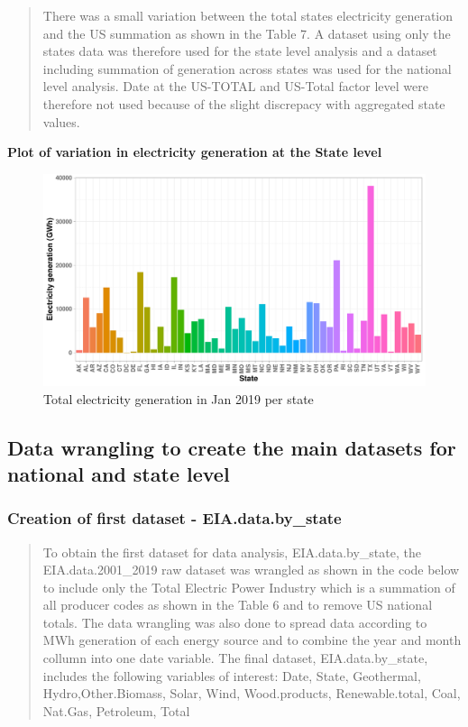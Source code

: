 \documentclass[12pt,]{article}
\begin{document}
\begin{quote}
There was a small variation between the total states electricity
generation and the US summation as shown in the Table 7. A dataset using
only the states data was therefore used for the state level analysis and
a dataset including summation of generation across states was used for
the national level analysis. Date at the US-TOTAL and US-Total factor
level were therefore not used because of the slight discrepacy with
aggregated state values.
\end{quote}

\textbf{Plot of variation in electricity generation at the State level}

\begin{figure}
\centering
\includegraphics{Kara_ENV872_Project_files/figure-latex/unnamed-chunk-11-1.pdf}
\caption{Total electricity generation in Jan 2019 per state}
\end{figure}

\subsection{Data wrangling to create the main datasets for national and
state
level}\label{data-wrangling-to-create-the-main-datasets-for-national-and-state-level}

\subsubsection{Creation of first dataset -
EIA.data.by\_state}\label{creation-of-first-dataset---eia.data.by_state}

\begin{quote}
To obtain the first dataset for data analysis, EIA.data.by\_state, the
EIA.data.2001\_2019 raw dataset was wrangled as shown in the code below
to include only the Total Electric Power Industry which is a summation
of all producer codes as shown in the Table 6 and to remove US national
totals. The data wrangling was also done to spread data according to MWh
generation of each energy source and to combine the year and month
collumn into one date variable. The final dataset, EIA.data.by\_state,
includes the following variables of interest: Date, State, Geothermal,
Hydro,Other.Biomass, Solar, Wind, Wood.products, Renewable.total, Coal,
Nat.Gas, Petroleum, Total
\end{quote}
\end{document}

